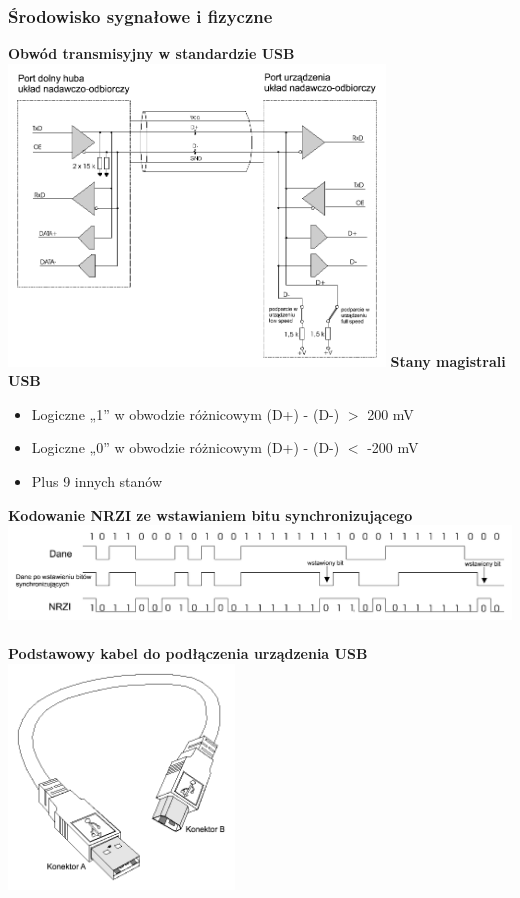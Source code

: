 \documentclass[a4paper,twoside]{article}
\begin{document}
		\subsubsection{Środowisko sygnałowe i fizyczne}
			\textbf{Obwód transmisyjny w standardzie USB}\\
			\includegraphics[width=10cm]{./wyklady/USB_7_1.pdf}
			\textbf{Stany magistrali USB}\\
			\begin{itemize}
				\item Logiczne „1” w obwodzie różnicowym (D+) - (D-) $>$ 200 mV
				\item Logiczne „0” w obwodzie różnicowym (D+) - (D-) $<$ -200 mV
				\item Plus 9 innych stanów
			\end{itemize}
			\textbf{Kodowanie NRZI ze wstawianiem bitu synchronizującego}\\
			\includegraphics[width=15cm]{./wyklady/USB_9_1.pdf}\\\\
			\textbf{Podstawowy kabel do podłączenia urządzenia USB}\\
			\includegraphics[width=6cm]{./wyklady/USB_10_1.pdf}
\end{document}
